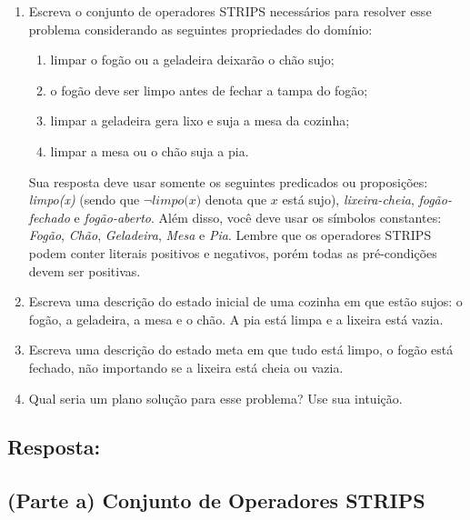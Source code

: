 \documentclass[a4paper,12pt]{article}
\begin{document}
\begin{enumerate}
	\item[\textbf{Parte a.}] Escreva o conjunto de operadores STRIPS necessários para resolver esse problema considerando as seguintes propriedades do domínio:
	\begin{enumerate}
		\item[\textbf{i.}] limpar o fogão ou a geladeira deixarão o chão sujo;
		\item[\textbf{ii.}] o fogão deve ser limpo antes de fechar a tampa do fogão;
		\item[\textbf{iii.}] limpar a geladeira gera lixo e suja a mesa da cozinha;
		\item[\textbf{iv.}] limpar a mesa ou o chão suja a pia.
	\end{enumerate}
	Sua resposta deve usar somente os seguintes predicados ou proposições: \textit{limpo(x)} (sendo que $\neg \textit{limpo(x)}$ denota que $x$ está sujo), \textit{lixeira-cheia}, \textit{fogão-fechado} e \textit{fogão-aberto}. Além disso, você deve usar os símbolos constantes: \textit{Fogão}, \textit{Chão}, \textit{Geladeira}, \textit{Mesa} e \textit{Pia}. Lembre que os operadores STRIPS podem conter literais positivos e negativos, porém todas as pré-condições devem ser positivas.
	
	\item[\textbf{Parte b.}] Escreva uma descrição do estado inicial de uma cozinha em que estão sujos: o fogão, a geladeira, a mesa e o chão. A pia está limpa e a lixeira está vazia.
	
	\item[\textbf{Parte c.}] Escreva uma descrição do estado meta em que tudo está limpo, o fogão está fechado, não importando se a lixeira está cheia ou vazia.
	
	\item[\textbf{Parte d.}] Qual seria um plano solução para esse problema? Use sua intuição.
\end{enumerate}


\subsection*{Resposta:}

\bigskip

\subsection*{(Parte a) Conjunto de Operadores STRIPS}
\end{document}
